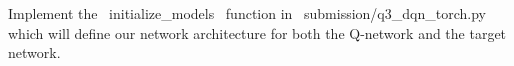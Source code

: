 \item {}
Implement the ~initialize_models~ function in ~submission/q3_dqn_torch.py~ which will define our network architecture for both the Q-network and the target network.